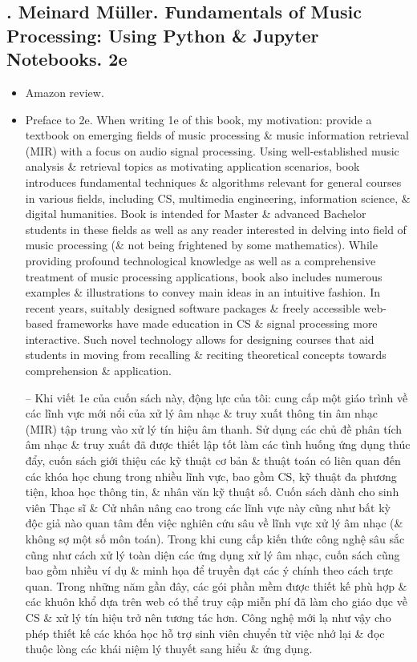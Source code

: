 \documentclass{article}
\begin{document}
\subsection{\cite{Mueller2015, Mueller2021}. {\sc Meinard M\"{u}ller}. Fundamentals of Music Processing: Using Python \& Jupyter Notebooks. 2e}
{\sf[91 citations]}
\begin{itemize}
	\item {\sf Amazon review.}
	\item {\sf Preface to 2e.} When writing 1e of this book, my motivation: provide a textbook on emerging fields of music processing \& music information retrieval (MIR) with a focus on audio signal processing. Using well-established music analysis \& retrieval topics as motivating application scenarios, book introduces fundamental techniques \& algorithms relevant for general courses in various fields, including CS, multimedia engineering, information science, \& digital humanities. Book is intended for Master \& advanced Bachelor students in these fields as well as any reader interested in delving into field of music processing (\& not being frightened by some mathematics). While providing profound technological knowledge as well as a comprehensive treatment of music processing applications, book also includes numerous examples \& illustrations to convey main ideas in an intuitive fashion. In recent years, suitably designed software packages \& freely accessible web-based frameworks have made education in CS \& signal processing more interactive. Such novel technology allows for designing courses that aid students in moving from recalling \& reciting theoretical concepts towards comprehension \& application.
	
	-- Khi viết 1e của cuốn sách này, động lực của tôi: cung cấp một giáo trình về các lĩnh vực mới nổi của xử lý âm nhạc \& truy xuất thông tin âm nhạc (MIR) tập trung vào xử lý tín hiệu âm thanh. Sử dụng các chủ đề phân tích âm nhạc \& truy xuất đã được thiết lập tốt làm các tình huống ứng dụng thúc đẩy, cuốn sách giới thiệu các kỹ thuật cơ bản \& thuật toán có liên quan đến các khóa học chung trong nhiều lĩnh vực, bao gồm CS, kỹ thuật đa phương tiện, khoa học thông tin, \& nhân văn kỹ thuật số. Cuốn sách dành cho sinh viên Thạc sĩ \& Cử nhân nâng cao trong các lĩnh vực này cũng như bất kỳ độc giả nào quan tâm đến việc nghiên cứu sâu về lĩnh vực xử lý âm nhạc (\& không sợ một số môn toán). Trong khi cung cấp kiến thức công nghệ sâu sắc cũng như cách xử lý toàn diện các ứng dụng xử lý âm nhạc, cuốn sách cũng bao gồm nhiều ví dụ \& minh họa để truyền đạt các ý chính theo cách trực quan. Trong những năm gần đây, các gói phần mềm được thiết kế phù hợp \& các khuôn khổ dựa trên web có thể truy cập miễn phí đã làm cho giáo dục về CS \& xử lý tín hiệu trở nên tương tác hơn. Công nghệ mới lạ như vậy cho phép thiết kế các khóa học hỗ trợ sinh viên chuyển từ việc nhớ lại \& đọc thuộc lòng các khái niệm lý thuyết sang hiểu \& ứng dụng.
	

\end{itemize}
\end{document}
